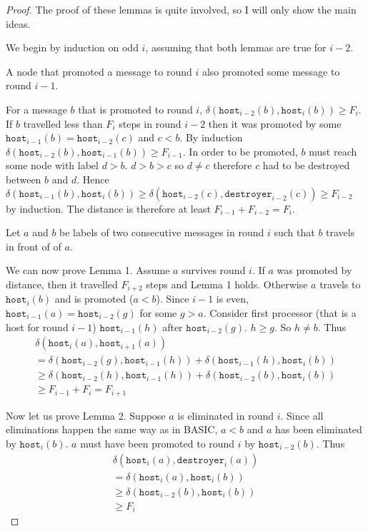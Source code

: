 \documentclass{article}
\begin{document}
\begin{proof}
The proof of these lemmas is quite involved, so I will only show the main ideas.

We begin by induction on odd $i$, assuming that both lemmas are true for $i-2$.

A node that promoted a message to round $i$ also promoted some message to round $i-1$.

For a message $b$ that is promoted to round $i$, $\delta(\texttt{host}_{i-2}(b), \texttt{host}_i(b)) \geq F_i$. If $b$ travelled less than $F_i$ steps in round $i-2$ then it was promoted by some $\texttt{host}_{i-1}(b) = \texttt{host}_{i-2}(c)$ and $c < b$. By induction $\delta(\texttt{host}_{i-2}(b),\texttt{host}_{i-1}(b)) \geq F_{i-1}$. In order to be promoted, $b$ must reach some node with label $d > b$. $d > b > c$ so $d \neq c$ therefore $c$ had to be destroyed between $b$ and $d$. Hence $\delta(\texttt{host}_{i-1}(b), \texttt{host}_i(b)) \geq \delta(\texttt{host}_{i-2}(c), \texttt{destroyer}_{i-2}(c)) \geq F_{i-2}$ by induction. The distance is therefore at least $F_{i-1} + F_{i-2} = F_i$.

Let $a$ and $b$ be labels of two consecutive messages in round $i$ such that $b$ travels in front of of $a$.

We can now prove Lemma 1. Assume $a$ survives round $i$. If $a$ was promoted by distance, then it travelled $F_{i+2}$ steps and Lemma 1 holds. 
Otherwise $a$ travels to $\texttt{host}_i(b)$ and is promoted ($a < b$). Since $i-1$ is even, $\texttt{host}_{i-1}(a) = \texttt{host}_{i-2}(g)$ for some $g > a$. Consider first processor (that is a host for round $i - 1$) $\texttt{host}_{i-1}(h)$ after $\texttt{host}_{i-2}(g)$. $h \geq g$. So $h \neq b$. Thus
\begin{multline*}
\delta(\texttt{host}_i(a), \texttt{host}_{i+1}(a))  \\
=  \delta(\texttt{host}_{i-2}(g), \texttt{host}_{i-1}(h)) +
\delta(\texttt{host}_{i-1}(h), \texttt{host}_i(b))  \\
\geq  \delta(\texttt{host}_{i-2}(h), \texttt{host}_{i-1}(h)) +
\delta(\texttt{host}_{i-2}(b), \texttt{host}_i(b))  \\
\geq  F_{i-1} + F_i = F_{i+1}
\end{multline*}

Now let us prove Lemma 2. Suppose $a$ is eliminated in round $i$. Since all eliminations happen the same way as in BASIC, $a < b$ and $a$ has been eliminated by $\texttt{host}_i(b)$. $a$ must have been promoted to round $i$ by $\texttt{host}_{i-2}(b)$. Thus
\begin{multline*}
\delta(\texttt{host}_i(a), \texttt{destroyer}_i(a))  \\
= \delta(\texttt{host}_i(a), \texttt{host}_{i}(b)) \\
\geq  \delta(\texttt{host}_{i-2}(b), \texttt{host}_i(b)) \\
\geq  F_i
\end{multline*}
\end{proof}
\end{document}
